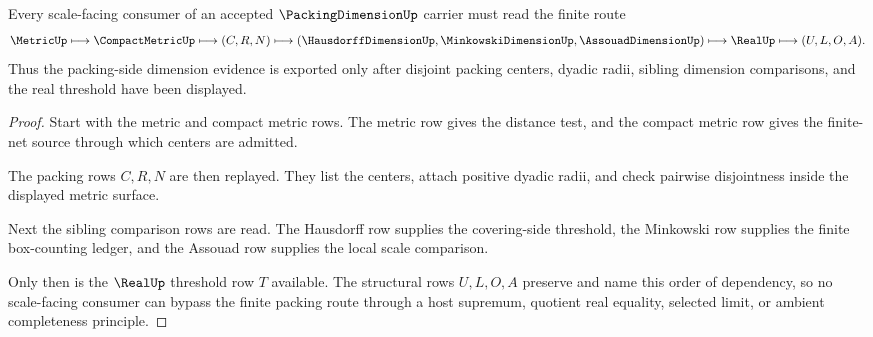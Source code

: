 \begin{theorem}
\label{thm:packing-dimension-scale-packing-route}
Every scale-facing consumer of an accepted $\PackingDimensionUp$ carrier must
read the finite route
$$
\MetricUp\longmapsto\CompactMetricUp\longmapsto(C,R,N)\longmapsto
(\HausdorffDimensionUp,\MinkowskiDimensionUp,\AssouadDimensionUp)
\longmapsto\RealUp\longmapsto(U,L,O,A).
$$
Thus the packing-side dimension evidence is exported only after disjoint
packing centers, dyadic radii, sibling dimension comparisons, and the real
threshold have been displayed.
\end{theorem}
\begin{proof}
Start with the metric and compact metric rows. The metric row gives the
distance test, and the compact metric row gives the finite-net source through
which centers are admitted.

The packing rows $C,R,N$ are then replayed. They list the centers, attach
positive dyadic radii, and check pairwise disjointness inside the displayed
metric surface.

Next the sibling comparison rows are read. The Hausdorff row supplies the
covering-side threshold, the Minkowski row supplies the finite box-counting
ledger, and the Assouad row supplies the local scale comparison.

Only then is the $\RealUp$ threshold row $T$ available. The structural rows
$U,L,O,A$ preserve and name this order of dependency, so no scale-facing
consumer can bypass the finite packing route through a host supremum,
quotient real equality, selected limit, or ambient completeness principle.
\end{proof}


\begin{closurestatus}{\PackingDimensionUp}
  \theoryclosure{\seedClosure}
  \formalstatus{\unformalizedV}
\end{closurestatus}
